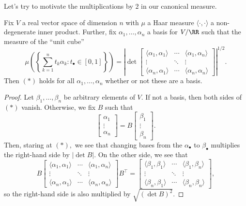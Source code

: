 \documentclass[../notes.tex]{subfiles}
\begin{document}
Let's try to motivate the multiplications by $2$ in our canonical measure.
\begin{lemma} \label{lem:detisvol}
    Fix $V$ a real vector space of dimension $n$ with $\mu$ a Haar measure $\langle\cdot,\cdot\rangle$ a non-degenerate inner product. Further, fix $\alpha_1,\ldots,\alpha_n$ a basis for $V/\RR$ such that the measure of the ``unit cube''
    \[\mu\left(\left\{\sum_{k=1}^n t_k\alpha_k:t_\bullet\in[0,1]\right\}\right)=\left|\det\begin{bmatrix}
        \langle\alpha_1,\alpha_1\rangle & \cdots & \langle\alpha_1,\alpha_n\rangle \\
        \vdots & \ddots & \vdots \\
        \langle\alpha_n,\alpha_1\rangle & \cdots & \langle\alpha_n,\alpha_n\rangle
    \end{bmatrix}\right|^{1/2}.\tag{$*$}\]
    Then $(*)$ holds for all $\alpha_1,\ldots,\alpha_n$ whether or not these are a basis.
\end{lemma}
\begin{proof}
    Let $\beta_1,\ldots,\beta_n$ be arbitrary elements of $V.$ If not a basis, then both sides of $(*)$ vanish. Otherwise, we fix $B$ such that
    \[\begin{bmatrix}\alpha_1 \\ \vdots \\ \alpha_n\end{bmatrix} = B\begin{bmatrix}\beta_1 \\ \vdots \\ \beta_n \end{bmatrix}.\]
    Then, staring at $(*),$ we see that changing bases from the $\alpha_\bullet$ to $\beta_\bullet$ multiplies the right-hand side by $|\det B|.$ On the other side, we see that
    \[B\begin{bmatrix}
        \langle\alpha_1,\alpha_1\rangle & \cdots & \langle\alpha_1,\alpha_n\rangle \\
        \vdots & \ddots & \vdots \\
        \langle\alpha_n,\alpha_1\rangle & \cdots & \langle\alpha_n,\alpha_n\rangle
    \end{bmatrix}B^\intercal=\begin{bmatrix}
        \langle\beta_1,\beta_1\rangle & \cdots & \langle\beta_1,\beta_n\rangle \\
        \vdots & \ddots & \vdots \\
        \langle\beta_n,\beta_1\rangle & \cdots & \langle\beta_n,\beta_n\rangle
    \end{bmatrix},\]
    so the right-hand side is also multiplied by $\sqrt{(\det B)^2}.$
\end{proof}
\end{document}
